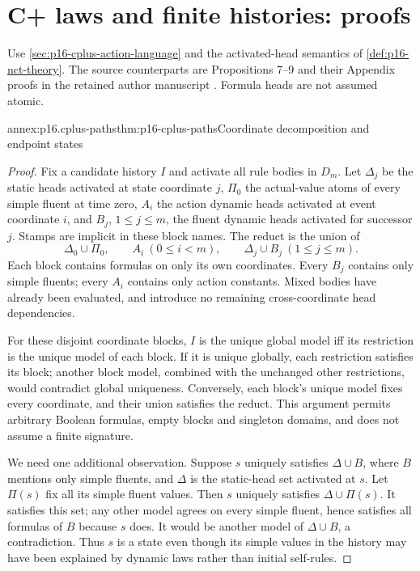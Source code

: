 \section{C+ laws and finite histories: proofs}
\label{sec:annex-p16-cplus-action-language}
Use \cref{sec:p16-cplus-action-language} and the activated-head semantics
of \cref{def:p16-nct-theory}. The source counterparts are Propositions
7--9 and their Appendix proofs in the retained author manuscript
\cite{GiunchigliaEtAl2003CplusAuthor}.
Formula heads are not assumed atomic.

\begin{annexitem}{annex:p16.cplus-paths}{thm:p16-cplus-paths}{Coordinate decomposition and endpoint states}
\begin{proof}
Fix a candidate history \(I\) and activate all rule bodies in \(D_m\).
Let \(\Delta_j\) be the static heads activated at state coordinate \(j\),
\(\Pi_0\) the actual-value atoms of every simple fluent at time zero,
\(A_i\) the action dynamic heads activated at event coordinate \(i\),
and \(B_j\), \(1\leq j\leq m\), the fluent dynamic heads activated
for successor \(j\). Stamps are implicit in these block names.
The reduct is the union of
\[
 \Delta_0\cup\Pi_0,\qquad
 A_i\ (0\leq i<m),\qquad
 \Delta_j\cup B_j\ (1\leq j\leq m).
\]
Each block contains formulas on only its own coordinates.
Every \(B_j\) contains only simple fluents; every \(A_i\) contains
only action constants. Mixed bodies have already been evaluated, and
introduce no remaining cross-coordinate head dependencies.

For these disjoint coordinate blocks, \(I\) is the unique global model
iff its restriction is the unique model of each block.
If it is unique globally, each restriction satisfies its block;
another block model, combined with the unchanged other restrictions,
would contradict global uniqueness. Conversely, each block's unique
model fixes every coordinate, and their union satisfies the reduct.
This argument permits arbitrary Boolean formulas, empty blocks and
singleton domains, and does not assume a finite signature.

We need one additional observation. Suppose \(s\) uniquely satisfies
\(\Delta\cup B\), where \(B\) mentions only simple fluents, and
\(\Delta\) is the static-head set activated at \(s\).
Let \(\Pi(s)\) fix all its simple fluent values.
Then \(s\) uniquely satisfies \(\Delta\cup\Pi(s)\).
It satisfies this set; any other model agrees on every simple fluent,
hence satisfies all formulas of \(B\) because \(s\) does.
It would be another model of \(\Delta\cup B\), a contradiction.
Thus \(s\) is a state even though its simple values in the history may
have been explained by dynamic laws rather than initial self-rules.


\end{proof}
\end{annexitem}
